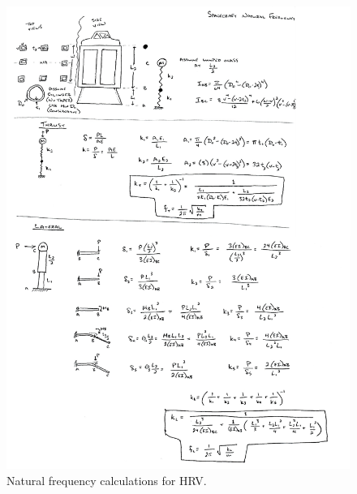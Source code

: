 \documentclass[paper=letter, fontsize=11pt]{scrartcl} %
\numberwithin{equation}{section} %
\numberwithin{figure}{section} %
\numberwithin{table}{section} %
\begin{document}
\begin{figure}[H]
    \begin{center}
        \includegraphics[width=1\textwidth]{Pics/freq.png}
        \caption{Natural frequency calculations for HRV.}
        \label{fig:p6}
    \end{center}
\end{figure}
\end{document}
